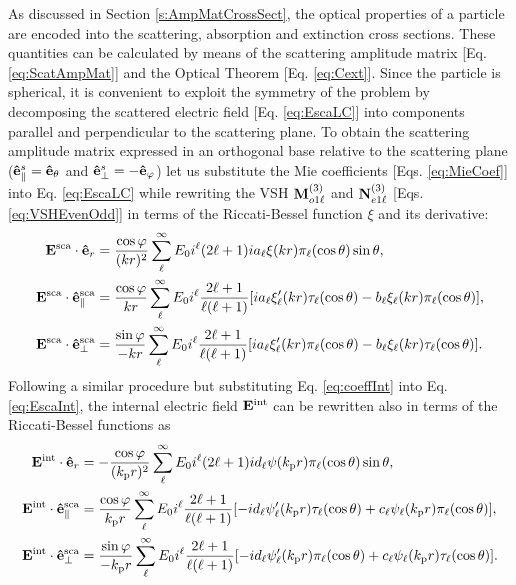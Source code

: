 As discussed in Section \ref{s:AmpMatCrossSect}, the optical properties of a particle are encoded into the scattering, absorption and extinction cross sections. These quantities can be calculated by means of the scattering amplitude matrix [Eq. \eqref{eq:ScatAmpMat}] and the Optical Theorem [Eq. \eqref{eq:Cext}]. Since the particle is spherical, it is convenient to exploit the symmetry of the problem  by decomposing the scattered electric field [Eq. \eqref{eq:EscaLC}] into components parallel and perpendicular to the scattering plane. To obtain the scattering amplitude matrix  expressed in an orthogonal base relative to the scattering plane ($\vu{e}_\parallel^s =\vu{e}_\theta$ and $\vu{e}_\perp^s=-\vu{e}_\varphi$) let us substitute the Mie coefficients [Eqs. \eqref{eq:MieCoef}] into Eq. \eqref{eq:EscaLC}  while rewriting the VSH $\vb{M}^{(3)}_{o1\ell}$  and $\vb{N}^{(3)}_{e1\ell}$ [Eqs. \eqref{eq:VSHEvenOdd}] in terms of the Riccati-Bessel function  $\xi$ and its derivative:
%
\begin{subequations}\label{eq:Esca}%
\begin{align}
\vb{E}^\text{sca}\cdot\vu{e}_r &=  \frac{\cos\varphi}{(kr)^2}
								\sum_\ell^\infty E_0i^\ell(2\ell+1)
								ia_\ell \xi(kr)\pi_\ell(\cos\theta) \sin\theta ,
\label{eq:EscaR}\\
\vb{E}^\text{sca}\cdot\vu{e}^\text{sca}_\parallel &=  \frac{\cos\varphi}{kr}
								\sum_\ell^\infty E_0i^\ell\frac{2\ell+1}{\ell(\ell+1)}
						[i a_\ell\xi_\ell'(kr)\tau_\ell(\cos\theta)-b_\ell\xi_\ell(kr)\pi_\ell(\cos\theta)],
\label{eq:EscaTheta}\\
\vb{E}^\text{sca}\cdot\vu{e}^\text{sca}_\perp &=  \frac{\sin\varphi}{-kr}
								\sum_\ell^\infty E_0i^\ell\frac{2\ell+1}{\ell(\ell+1)}
						[i a_\ell\xi_\ell'(kr)\pi_\ell(\cos\theta)-b_\ell\xi_\ell(kr)\tau_\ell(\cos\theta)].
\label{eq:EscaMPhi}
\end{align}%
\end{subequations}
%
Following a similar procedure but substituting Eq. \eqref{eq:coeffInt} into Eq. \eqref{eq:EscaInt}, the internal electric field $\vb{E}^\text{int}$ can be rewritten also in terms of the Riccati-Bessel functions as
%
\begin{subequations}\label{eq:Eint}%
\begin{align}
\vb{E}^\text{int}\cdot\vu{e}_r &=  -\frac{\cos\varphi}{(k_\text{p}r)^2}
               \sum_\ell^\infty E_0i^\ell(2\ell+1)
               id_\ell \psi(k_\text{p}r)\pi_\ell(\cos\theta) \sin\theta ,
\label{eq:EintR}\\
\vb{E}^\text{int}\cdot\vu{e}^\text{sca}_\parallel &=  \frac{\cos\varphi}{k_\text{p}r}
               \sum_\ell^\infty E_0i^\ell\frac{2\ell+1}{\ell(\ell+1)}
           [-i d_\ell\psi_\ell'(k_\text{p}r)\tau_\ell(\cos\theta)+c_\ell\psi_\ell(k_\text{p}r)\pi_\ell(\cos\theta)],
\label{eq:EintTheta}\\
\vb{E}^\text{int}\cdot\vu{e}^\text{sca}_\perp &=  \frac{\sin\varphi}{-k_\text{p}r}
               \sum_\ell^\infty E_0i^\ell\frac{2\ell+1}{\ell(\ell+1)}
           [-i d_\ell\psi_\ell'(k_\text{p}r)\pi_\ell(\cos\theta)+c_\ell\psi_\ell(k_\text{p}r)\tau_\ell(\cos\theta)].
\label{eq:EintMPhi}
\end{align}%
\end{subequations}



